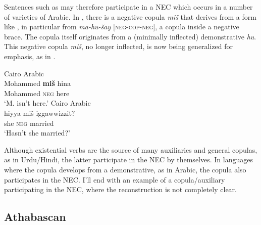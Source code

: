 \documentclass[output=paper,draft,draftmode,colorlinks,citecolor=brown]{langscibook}
\begin{document}
Sentences such as  may therefore participate in
a NEC which occurs in a number of varieties of Arabic. In
,
there is a negative copula \textit{miš} that derives from a form like
, in particular from \textit{ma-hu-šay}
[\textsc{neg-cop-neg}], a
copula inside a negative brace. The copula itself originates from a
(minimally inflected) demonstrative \textit{hu}. This negative copula
\textit{miš}, no longer inflected, is now being generalized for emphasis,
as in .
%
\begin{exe}\ex Cairo Arabic \label{ex:other-arabic-Mohammed}\\
    \gll Mohammed   \textbf{miš}   hina    \\
    Mohammed  \textsc{neg}  here \\
    \glt `M. isn't here.' \citealp[2]{Diem2014}
    \ex Cairo Arabic \label{ex:other-arabic-married}\\
    \gll hiyya   miš  iggawwizzit?     \\
    she  \textsc{neg}  married \\
    \glt `Hasn't she married?’ \citep[341]{Woidich2006}
    \end{exe}

Although existential verbs are the source of many auxiliaries and general
copulas, as in Urdu\slash Hindi, the latter participate in the NEC by
themselves. In languages where the copula develops from a demonstrative, as
in Arabic, the copula also participates in the NEC. I'll end with an
example of a copula\slash auxiliary participating in the NEC, where the
reconstruction is not completely clear.

\subsection{Athabascan}\label{sec:oth-2.4}
\end{document}
